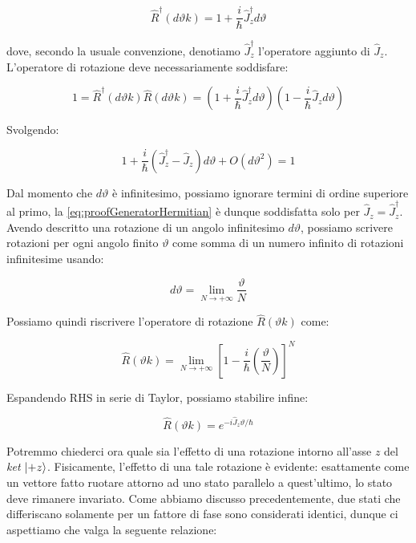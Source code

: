 	\begin{equation} \label{eq:introducingGeneratorRot}
		\hat{R}^\dagger ( { d \vartheta k } ) = 1 + \frac{i}{\hbar} \hat{J}_z^\dagger d \vartheta
	\end{equation}

dove, secondo la usuale convenzione, denotiamo $\hat{J}_z^\dagger$ l'operatore aggiunto di $\hat{J}_z$. L'operatore di rotazione deve necessariamente soddisfare:

	\begin{equation}
	 	1 = \hat{R}^\dagger(d \vartheta k) \hat{R}(d \vartheta k) = \left ( 1 + \frac{i}{\hbar} \hat{J}_z^\dagger d \vartheta \right ) \left ( 1 - \frac{i}{\hbar} \hat{J}_z d \vartheta \right )
	\end{equation}

Svolgendo:

	\begin{equation} \label{eq:proofGeneratorHermitian}
		1 + \frac{i}{\hbar} \left ( \hat{J}^\dagger_z - \hat{J}_z \right ) d \vartheta + O(d \vartheta ^2) = 1
	\end{equation}

Dal momento che $d \vartheta$ \`e infinitesimo, possiamo ignorare termini di ordine superiore al primo, la \eqref{eq:proofGeneratorHermitian} \`e dunque soddisfatta solo per $\hat{J}_z = \hat{J}^\dagger_z$. Avendo descritto una rotazione di un angolo infinitesimo $d \vartheta$, possiamo scrivere rotazioni per ogni angolo finito $\vartheta$ come somma di un numero infinito di rotazioni infinitesime usando:

	\[
		d \vartheta = \lim_{N \to +\infty} \frac{\vartheta}{N}
	\]

Possiamo quindi riscrivere l'operatore di rotazione $\hat{R} (\vartheta k )$ come:

	\begin{equation}
		\hat{R} (\vartheta k ) = \lim_{N \to +\infty} \left [ 1 - \frac{i}{\hbar} \left ( \frac {\vartheta}{N} \right ) \right ] ^ N
	\end{equation}

Espandendo RHS in serie di Taylor, possiamo stabilire infine:

	\begin{equation} \label{eq:rOperatorAsExp}
		\hat{R} (\vartheta k ) = e ^ {-i \hat{J}_z \vartheta / \hbar}
	\end{equation}

Potremmo chiederci ora quale sia l'effetto di una rotazione intorno all'asse $z$ del \textit{ket} $\ket{+z}$. Fisicamente, l'effetto di una tale rotazione \`e evidente: esattamente come un vettore fatto ruotare attorno ad uno stato parallelo a quest'ultimo, lo stato deve rimanere invariato. Come abbiamo discusso precedentemente, due stati che differiscano solamente per un fattore di fase sono considerati identici, dunque ci aspettiamo che valga la seguente relazione:

